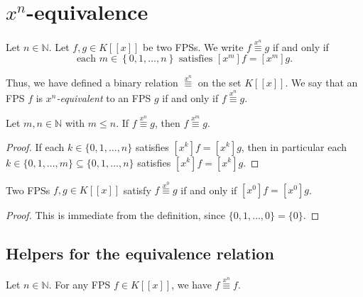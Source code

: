 \section{$x^{n}$-equivalence}

\begin{definition}
\label{def.fps.xneq}
\leantarget
\leanok
Let $n\in\mathbb{N}$. Let $f,g\in K\left[\left[x\right]\right]$ be two FPSs.
We write $f\overset{x^{n}}{\equiv}g$ if and only if
\[
\text{each }m\in\left\{0,1,\ldots,n\right\}\text{ satisfies }
\left[x^{m}\right]f=\left[x^{m}\right]g.
\]

Thus, we have defined a binary relation $\overset{x^{n}}{\equiv}$ on the set
$K\left[\left[x\right]\right]$. We say that an FPS $f$ is $x^{n}$\emph{-equivalent}
to an FPS $g$ if and only if $f\overset{x^{n}}{\equiv}g$.
\end{definition}

\begin{lemma}
\label{lem.fps.xneq.of-le}
\leanhelper
\leanok
Let $m,n\in\mathbb{N}$ with $m\leq n$. If $f\overset{x^{n}}{\equiv}g$,
then $f\overset{x^{m}}{\equiv}g$.
\end{lemma}

\begin{proof}
\leanok
If each $k\in\{0,1,\ldots,n\}$ satisfies $[x^k]f=[x^k]g$, then in particular
each $k\in\{0,1,\ldots,m\}\subseteq\{0,1,\ldots,n\}$ satisfies $[x^k]f=[x^k]g$.
\end{proof}

\begin{lemma}
\label{lem.fps.xneq.zero-iff}
\leanhelper
\leanok
Two FPSs $f,g\in K[[x]]$ satisfy $f\overset{x^{0}}{\equiv}g$ if and only if
$[x^0]f=[x^0]g$.
\end{lemma}

\begin{proof}
\leanok
This is immediate from the definition, since $\{0,1,\ldots,0\}=\{0\}$.
\end{proof}

\subsection{Helpers for the equivalence relation}

\begin{lemma}
\label{lem.fps.xneq.refl}
\leanhelper
\leanok
Let $n\in\mathbb{N}$. For any FPS $f\in K[[x]]$, we have
$f\overset{x^{n}}{\equiv}f$.
\end{lemma}

